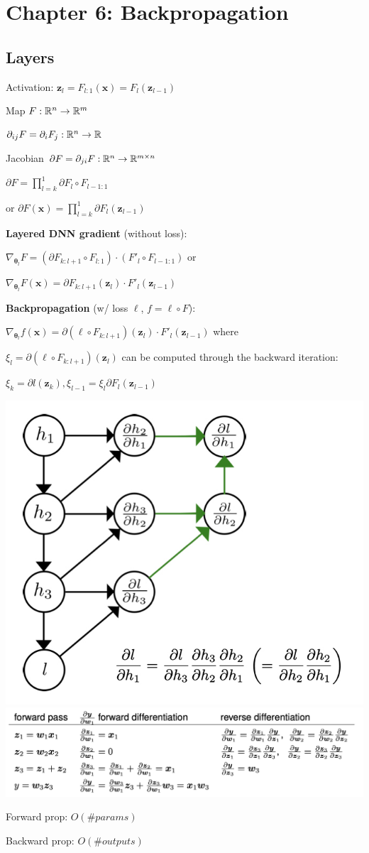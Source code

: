 \section*{Chapter 6: Backpropagation}

\subsection*{Layers}

Activation:
$\mathbf z_l = F_{l:1}(\mathbf x) = F_l(\mathbf z_{l-1})$

Map
$F: \mathbb{R}^n \rightarrow \mathbb{R}^m$

$\partial_{ij}F=\partial_iF_j:\mathbb{R}^n\rightarrow\mathbb{R}$

Jacobian
$\partial F=\partial_{ji}F:\mathbb{R}^n\rightarrow\mathbb{R}^{m\times n}$

$\partial F=\prod^1_{l=k}\partial F_l\circ F_{l-1:1}$ 

or $\partial F(\mathbf x)=\prod^1_{l=k}\partial F_l(\mathbf z_{l-1})$

\textbf{Layered DNN gradient} (without loss):

$\nabla_{\mathbf \theta_l}F=(\partial F_{k:l+1}\circ F_{l:1})\cdot (F'_l\circ F_{l-1:1})$ or

$\nabla_{\mathbf \theta_l}F(\mathbf x)=\partial F_{k:l+1}(\mathbf z_l)\cdot F'_l(\mathbf z_{l-1})$

\textbf{Backpropagation} (w/ loss $\ell$, $f=\ell\circ F$):

$\nabla_{\mathbf \theta_l}f(\mathbf x)=\partial (\ell \circ F_{k:l+1})(\mathbf z_l)\cdot F'_l(\mathbf z_{l-1})$
where 

$\xi_l = \partial (\ell \circ F_{k:l+1})(\mathbf z_l)$ can be computed through the backward iteration:

$\xi_k = \partial l(\mathbf z_k), \xi_{l-1} = \xi_l \partial F_l(\mathbf z_{l-1})$

\includegraphics[width=0.7\columnwidth]{src/comp-graph.jpg}
\includegraphics[width=\columnwidth]{src/diff-modes.png}

Forward prop: $O(\#params)$

Backward prop: $O(\#outputs)$